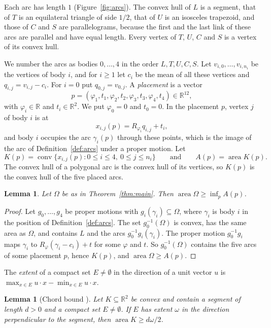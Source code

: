 \documentclass[11pt]{amsart}
\newtheorem{lemma}[theorem]{Lemma}
\theoremstyle{definition}
\theoremstyle{remark}
\numberwithin{equation}{section}
\newcommand{\R}{\mathbb{R}}
\newcommand{\area}{\operatorname{area}}
\newcommand{\conv}{\operatorname{conv}}
\begin{document}
Each arc has length $1$ (Figure~\ref{fig:arcs}). The convex hull of $L$ is a segment, that of $T$ is an equilateral triangle of side $1/2$, that of $U$ is an isosceles trapezoid, and those of $C$ and $S$ are parallelograms, because the first and the last link of these arcs are parallel and have equal length. Every vertex of $T$, $U$, $C$ and $S$ is a vertex of its convex hull.

We number the arcs as bodies $0,\dots,4$ in the order $L,T,U,C,S$. Let $v_{i,0},\dots,v_{i,n_i}$ be the vertices of body $i$, and for $i\ge1$ let $c_i$ be the mean of all these vertices and $q_{i,j}=v_{i,j}-c_i$. For $i=0$ put $q_{0,j}=v_{0,j}$. A \emph{placement} is a vector
\[
p=(\varphi_1,t_1,\varphi_2,t_2,\varphi_3,t_3,\varphi_4,t_4)\in\R^{12},
\]
with $\varphi_i\in\R$ and $t_i\in\R^2$. We put $\varphi_0=0$ and $t_0=0$. In the placement $p$, vertex $j$ of body $i$ is at
\[
x_{i,j}(p)=R_{\varphi_i}q_{i,j}+t_i,
\]
and body $i$ occupies the arc $\gamma_i(p)$ through these points, which is the image of the arc of Definition~\ref{def:arcs} under a proper motion. Let
\[
K(p)=\conv\bigl\{x_{i,j}(p): 0\le i\le4,\ 0\le j\le n_i\bigr\}\qquad\text{and}\qquad A(p)=\area K(p).
\]
The convex hull of a polygonal arc is the convex hull of its vertices, so $K(p)$ is the convex hull of the five placed arcs.

\begin{lemma}\label{lem:family}
Let $\Omega$ be as in Theorem~\textup{\ref{thm:main}}. Then $\area\Omega\ge\inf_pA(p)$.
\end{lemma}

\begin{proof}
Let $g_0,\dots,g_4$ be proper motions with $g_i(\gamma_i)\subseteq\Omega$, where $\gamma_i$ is body $i$ in the position of Definition~\ref{def:arcs}. The set $g_0^{-1}(\Omega)$ is convex, has the same area as $\Omega$, and contains $L$ and the arcs $g_0^{-1}g_i(\gamma_i)$. The proper motion $g_0^{-1}g_i$ maps $\gamma_i$ to $R_\varphi(\gamma_i-c_i)+t$ for some $\varphi$ and $t$. So $g_0^{-1}(\Omega)$ contains the five arcs of some placement $p$, hence $K(p)$, and $\area\Omega\ge A(p)$.
\end{proof}

The \emph{extent} of a compact set $E\ne\emptyset$ in the direction of a unit vector $u$ is $\max_{x\in E}u\cdot x-\min_{x\in E}u\cdot x$.

\begin{lemma}[Chord bound {\cite[Lemma~3.2]{Kel26}}]\label{lem:chordbound}
Let $K\subseteq\R^2$ be convex and contain a segment of length $d>0$ and a compact set $E\ne\emptyset$. If $E$ has extent $\omega$ in the direction perpendicular to the segment, then $\area K\ge d\omega/2$.
\end{lemma}
\end{document}
